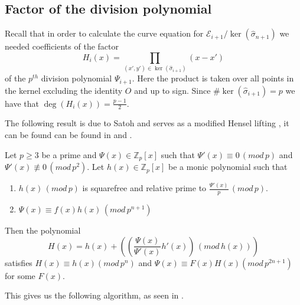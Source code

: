 \subsection{Factor of the division polynomial} \label{satohdiv}
Recall that in order to calculate the curve equation for $\mathscr{E}_{i+1}/\ker(\widehat{\sigma}_{n+1})$
we needed coefficients of the factor
$$H_i(x) = \prod_{(x',y')\in \ker(\widehat{\sigma}_{i+1})} (x-x')$$
of the $p^{th}$ division polynomial $\Psi_{i+1}$. Here the product is taken over all points in
the kernel excluding the identity $O$ and up to sign. Since $\#\ker(\widehat{\sigma}_{i+1}) = p$ we have
that $\deg(H_i(x)) = \frac{p-1}{2}$.

The following result is due to Satoh and serves as a modified Hensel lifting \cite{padic}, it can be found
can be found in \cite{Satoh} and \cite{Handbook}.
\begin{prop}
 Let $p\geq 3$ be a prime and $\Psi(x) \in \mathbb{Z}_p[x]$ such that $\Psi'(x) \equiv 0\, (mod\, p)$ and
$\Psi'(x) \not\equiv 0\, (mod\, p^2)$. Let $h(x) \in \mathbb{Z}_p[x]$ be a monic polynomial such that
\begin{enumerate}
  \item $h(x) \,(mod\,p)$ is squarefree and relative prime to $\frac{\Psi'(x)}{p}\,(mod\,p)$.
  \item $\Psi(x) \equiv f(x)h(x)\,(mod\,p^{n+1})$
\end{enumerate}
Then the polynomial
$$H(x) = h(x) + \left(\left(\frac{\Psi(x)}{\Psi'(x)} h'(x)\right)\,(mod\, h(x))\right)$$
satisfies $H(x) \equiv h(x) (mod\, p^n)$ and $\Psi(x) \equiv F(x)H(x) (mod \, p^{2n+1})$ for some $F(x)$.
\end{prop}
This gives us the following algorithm, as seen in \cite{Handbook}.
